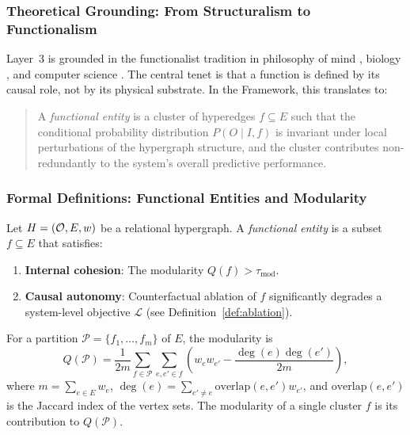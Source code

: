 \subsubsection{Theoretical Grounding: From Structuralism to Functionalism}
Layer~3 is grounded in the functionalist tradition in philosophy of mind \cite{putnam1967}, biology \cite{maturana1980}, and computer science \cite{turing1936}. The central tenet is that a function is defined by its causal role, not by its physical substrate. In the \Apeiron{} Framework, this translates to:
\begin{quote}
A \emph{functional entity} is a cluster of hyperedges $f \subseteq E$ such that the conditional probability distribution $P(O \mid I, f)$ is invariant under local perturbations of the hypergraph structure, and the cluster contributes non-redundantly to the system's overall predictive performance.
\end{quote}

\subsubsection{Formal Definitions: Functional Entities and Modularity}
\begin{definition}
Let $H = (\mathcal{O}, E, w)$ be a relational hypergraph. A \emph{functional entity} is a subset $f \subseteq E$ that satisfies:
\begin{enumerate}
    \item \textbf{Internal cohesion}: The modularity $Q(f) > \tau_{\text{mod}}$.
    \item \textbf{Causal autonomy}: Counterfactual ablation of $f$ significantly degrades a system-level objective $\mathcal{L}$ (see Definition~\ref{def:ablation}).
\end{enumerate}
\end{definition}

\begin{definition}
\label{def:modularity}
For a partition $\mathcal{P} = \{f_1, \dots, f_m\}$ of $E$, the modularity is
\[
Q(\mathcal{P}) = \frac{1}{2m} \sum_{f \in \mathcal{P}} \sum_{e,e' \in f} \left( w_e w_{e'} - \frac{\deg(e)\deg(e')}{2m} \right),
\]
where $m = \sum_{e \in E} w_e$, $\deg(e) = \sum_{e' \neq e} \text{overlap}(e,e') w_{e'}$, and $\text{overlap}(e,e')$ is the Jaccard index of the vertex sets. The modularity of a single cluster $f$ is its contribution to $Q(\mathcal{P})$.
\end{definition}

